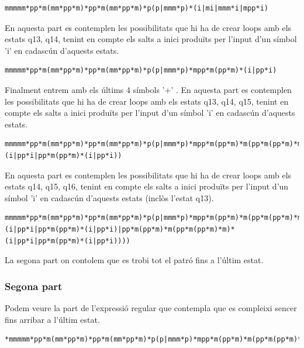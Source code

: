 \documentclass[12pt,a4paper]{report}
\begin{document}
\begin{lstlisting}
mmmmm*pp*m(mm*pp*m)*pp*m(mm*pp*m)*p(p|mmm*p)*(i|mi|mmm*i|mpp*i)
\end{lstlisting}

En aquesta part es contemplen les possibilitats que  hi ha de crear loops amb els estats q13, q14, tenint en compte els salts a inici produïts per l'input d'un símbol 'i' en cadascún d'aquests estats.

\begin{lstlisting}
mmmmm*pp*m(mm*pp*m)*pp*m(mm*pp*m)*p(p|mmm*p)*mpp*m(pp*m)*(i|pp*i)
\end{lstlisting}


Finalment entrem amb els últims 4 símbols '+' .
En aquesta part es contemplen les possibilitats que  hi ha de crear loops amb els estats q13, q14, q15, tenint en compte els salts a inici produïts per l'input d'un símbol 'i' en cadascún d'aquests estats.

\begin{lstlisting}
mmmmm*pp*m(mm*pp*m)*pp*m(mm*pp*m)*p(p|mmm*p)*mpp*m(pp*m)*m(pp*m(pp*m)*m)*(i|pp*i|pp*m(pp*m)*(i|pp*i))
\end{lstlisting}

En aquesta part es contemplen les possibilitats que  hi ha de crear loops amb els estats  q14, q15, q16,  tenint en compte els salts a inici produïts per l'input d'un símbol 'i' en cadascún d'aquests estats (inclòs l'estat q13).

\begin{lstlisting}
mmmmm*pp*m(mm*pp*m)*pp*m(mm*pp*m)*p(p|mmm*p)*mpp*m(pp*m)*m(pp*m(pp*m)*m)*m(pp*m(pp*m)*m(pp*m(pp*m)*m)*m)*(i|pp*i|pp*m(pp*m)*(i|pp*i)|pp*m(pp*m)*m(pp*m(pp*m)*m)*(i|pp*i|pp*m(pp*m)*(i|pp*i))))
\end{lstlisting}

La segona part on contolem que es trobi tot el patró fins a l'últim estat.

\subsubsection{Segona part}

Podem veure la part de l'expressió regular que contempla que es compleixi sencer fins arribar a l'últim estat.\\

\begin{lstlisting}
*mmmmm*pp*m(mm*pp*m)*pp*m(mm*pp*m)*p(p|mmm*p)*mpp*m(pp*m)*m(pp*m(pp*m)*m)*m(pp*m(pp*m)*m(pp*m(pp*m)*m)*m)*m(i|m|p)*
\end{lstlisting}
\end{document}
